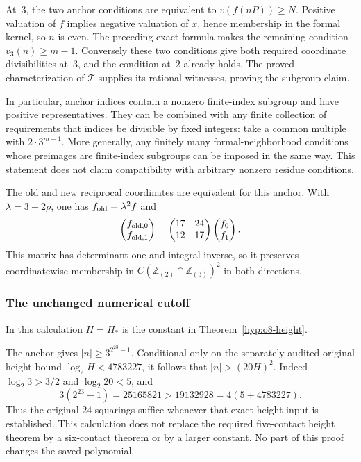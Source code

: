 At~$3$, the two anchor conditions are equivalent to
$v(f(nP))\ge N$. Positive valuation of $f$ implies negative valuation
of $x$, hence membership in the formal kernel, so $n$ is even.
The preceding exact formula makes the remaining condition
$v_3(n)\ge m-1$. Conversely these two conditions give both required
coordinate divisibilities at~$3$, and the condition at~$2$ already
holds. The proved characterization of $\mathcal T$ supplies its
rational witnesses, proving the subgroup claim.

In particular, anchor indices contain a nonzero finite-index subgroup
and have positive representatives. They can be combined with any
finite collection of requirements that indices be divisible by fixed
integers: take a common multiple with $2\cdot3^{m-1}$. More generally,
any finitely many formal-neighborhood conditions whose preimages are
finite-index subgroups can be imposed in the same way. This statement
does not claim compatibility with arbitrary nonzero residue conditions.

The old and new reciprocal coordinates are equivalent for this anchor.
With $\lambda=3+2\rho$, one has $f_{\rm old}=\lambda^2f$ and
\[
 \begin{pmatrix}f_{{\rm old},0}\\f_{{\rm old},1}\end{pmatrix}
 =\begin{pmatrix}17&24\\12&17\end{pmatrix}
 \begin{pmatrix}f_0\\f_1\end{pmatrix}.
\]
This matrix has determinant one and integral inverse, so it preserves
coordinatewise membership in
$C(\mathbb Z_{(2)}\cap\mathbb Z_{(3)})^2$ in both directions.

\subsubsection{The unchanged numerical cutoff}\label{subsec:o8-anchor-cutoff}
In this calculation $H=H_*$ is the constant in Theorem~\ref{hyp:o8-height}.

The anchor gives $|n|\ge3^{2^{23}-1}$. Conditional only on the separately
audited original height bound $\log_2H<4783227$, it follows that
$|n|>(20H)^2$. Indeed $\log_2 3>3/2$ and $\log_2 20<5$, and
\[
 3(2^{23}-1)=25165821
 >19132928=4(5+4783227).
\]
Thus the original $24$ squarings suffice whenever that exact height
input is established. This calculation does not replace the required
five-contact height theorem by a six-contact theorem or by a larger
constant. No part of this proof changes the saved polynomial.

